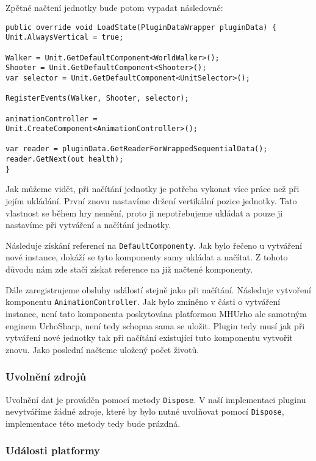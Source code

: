 Zpětné načtení jednotky bude potom vypadat následovně:

\begin{lstlisting}
public override void LoadState(PluginDataWrapper pluginData) {
Unit.AlwaysVertical = true;

Walker = Unit.GetDefaultComponent<WorldWalker>();
Shooter = Unit.GetDefaultComponent<Shooter>();
var selector = Unit.GetDefaultComponent<UnitSelector>();

RegisterEvents(Walker, Shooter, selector);

animationController =
Unit.CreateComponent<AnimationController>();

var reader = pluginData.GetReaderForWrappedSequentialData();
reader.GetNext(out health);
}
\end{lstlisting}

Jak můžeme vidět, při načítání jednotky je potřeba vykonat více práce než při jejím ukládání. První znovu nastavíme držení vertikální pozice jednotky. Tato vlastnost se během hry nemění, proto ji nepotřebujeme ukládat a pouze ji nastavíme při vytváření a načítání jednotky. 

Následuje získání referencí na \texttt{DefaultComponenty}. Jak bylo řečeno u vytváření nové instance, dokáží se tyto komponenty samy ukládat a načítat. Z tohoto důvodu nám zde stačí získat reference na již načtené komponenty. 

Dále zaregistrujeme obsluhy událostí stejně jako při načítání. Následuje vytvoření komponentu \texttt{AnimationController}. Jak bylo zmíněno v části o vytváření instance, není tato komponenta poskytována platformou MHUrho ale samotným enginem UrhoSharp, není tedy schopna sama se uložit. Plugin tedy musí jak při vytváření nové jednotky tak při načítání existující tuto komponentu vytvořit znovu. Jako poslední načteme uložený počet životů.

\subsubsection{Uvolnění zdrojů}

Uvolnění dat je prováděn pomocí metody \texttt{Dispose}. V naší implementaci pluginu nevytváříme žádné zdroje, které by bylo nutné uvolňovat pomocí \texttt{Dispose}, implementace této metody tedy bude prázdná.


\subsubsection{Události platformy}

